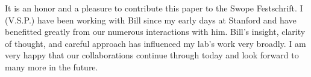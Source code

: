 \documentclass[journal=jpcbfk, layout=traditional, manuscript=article]{achemso}
\begin{document}
\begin{acknowledgement}
It is an honor and a pleasure to contribute this paper to the Swope Festschrift.  I (V.S.P.) have been working with Bill since my early days at Stanford and have benefitted greatly from our numerous interactions with him.  Bill's insight, clarity of thought, and careful approach has influenced my lab's work very broadly.  I am very happy that our collaborations continue through today and look forward to many more in the future.
\end{acknowledgement}


\end{document}
